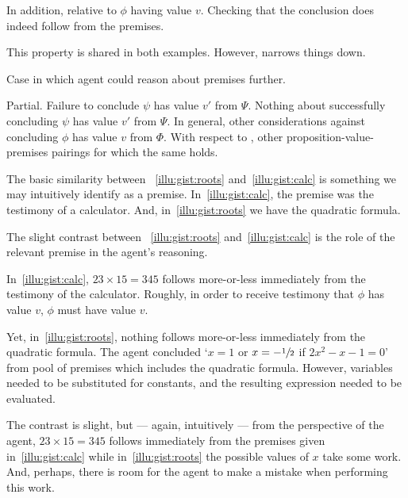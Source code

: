 \begin{note}
  In addition, relative to \(\phi\) having value \(v\).
  Checking that the conclusion does indeed follow from the premises.

  This property is shared in both examples.
  However, narrows things down.

  Case in which agent could reason about premises further.
\end{note}

\begin{note}
  Partial.
  Failure to conclude \(\psi\) has value \(v'\) from \(\Psi\).
  Nothing about successfully concluding \(\psi\) has value \(v'\) from \(\Psi\).
  In general, other considerations against concluding \(\phi\) has value \(v\) from \(\Phi\).
  With respect to , other proposition-value-premises pairings for which the same holds.
\end{note}

\begin{note}
  \color{red}
  The basic similarity between ~\ref{illu:gist:roots} and~\ref{illu:gist:calc} is something we may intuitively identify as a premise.
  In~\autoref{illu:gist:calc}, the premise was the testimony of a calculator.
  And, in~\autoref{illu:gist:roots} we have the quadratic formula.

  The slight contrast between ~\ref{illu:gist:roots} and~\ref{illu:gist:calc} is the role of the relevant premise in the agent's reasoning.

  In~\autoref{illu:gist:calc}, \(23 \times 15 = 345\) follows more-or-less immediately from the testimony of the calculator.
  Roughly, in order to receive testimony that \(\phi\) has value \(v\), \(\phi\) must have value \(v\).

  Yet, in~\autoref{illu:gist:roots}, nothing follows more-or-less immediately from the quadratic formula.
  The agent concluded `\(x = 1\) or \(x = -\sfrac{1}{2}\) if \(2x^{2} - x - 1 = 0\)' from pool of premises which includes the quadratic formula.
  However, variables needed to be substituted for constants, and the resulting expression needed to be evaluated.

  The contrast is slight, but --- again, intuitively --- from the perspective of the agent, \(23 \times 15 = 345\) follows immediately from the premises given in~\autoref{illu:gist:calc} while in~\autoref{illu:gist:roots} the possible values of \(x\) take some work.
  And, perhaps, there is room for the agent to make a mistake when performing this work.
\end{note}

